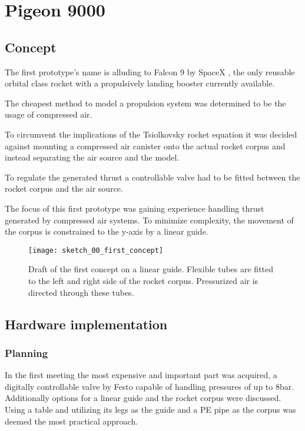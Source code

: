 \chapter{Pigeon 9000}
\section{Concept}
\author{Sebastian Schaffler}

The first prototype's name is alluding to Falcon 9 \cite{falcon9} by SpaceX \cite{spacex}, the only reusable orbital class rocket with a propulsively landing booster currently available. 

The cheapest method to model a propulsion system was determined to be the usage of compressed air. 

To circumvent the implications of the Tsiolkovsky rocket equation \cite{rocket-equation} it was decided against mounting a compressed air canister onto the actual rocket corpus and instead separating the air source and the model.
 

To regulate the generated thrust a controllable valve had to be fitted between the rocket corpus and the air source. 

The focus of this first prototype was gaining experience handling thrust generated by compressed air systems. To minimize complexity, the movement of the corpus is constrained to the y-axis by a linear guide.

\begin{figure}[h]
\centering

\texttt{[image: sketch\_00\_first\_concept]}

\caption{Draft of the first concept on a linear guide. Flexible tubes are fitted to the left and right side of the rocket corpus. Pressurized air is directed through these tubes.}
\end{figure}

\section{Hardware implementation}
\subsection{Planning}
In the first meeting the most expensive and important part was acquired, a digitally controllable valve by Festo \cite{festo-valve} capable of handling pressures of up to 8bar. Additionally options for a linear guide and the rocket corpus were discussed. Using a table and utilizing its legs as the guide and a PE pipe as the corpus was deemed the most practical approach. 

